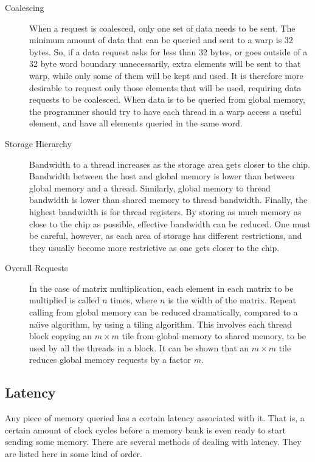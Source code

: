 \documentclass[a4paper,12pt]{report}
\begin{document}
\begin{description}
\item[Coalescing] When a request is coalesced, only one set of data needs to be sent\cite[p~20]{ CUDA_C_Best_Practices_Guide}.
The minimum amount of data that can be queried and sent to a warp is 32 bytes.
So, if a data request asks for less than 32 bytes, or goes outside of a 32 byte word boundary unnecessarily, extra elements will be sent to that warp, while only some of them will be kept and used.
It is therefore more desirable to request only those elements that will be used, requiring data requests to be coalesced.
When data is to be queried from global memory, the programmer should try to have each thread in a warp access a useful element, and have all elements queried in the same word.

\item[Storage Hierarchy] Bandwidth to a thread increases as the storage area gets closer to the chip.
Bandwidth between the host and global memory is lower than between global memory and a thread.
Similarly, global memory to thread bandwidth is lower than shared memory to thread bandwidth.
Finally, the highest bandwidth is for thread registers.
By storing as much memory as close to the chip as possible, effective bandwidth can be reduced.
One must be careful, however, as each area of storage has different restrictions, and they usually become more restrictive as one gets closer to the chip.

\item[Overall Requests] In the case of matrix multiplication, each element in each matrix to be multiplied is called $n$ times, where $n$ is the width of the matrix.
Repeat calling from global memory can be reduced dramatically, compared to a na\"{\i}ve algorithm, by using a tiling algorithm.
This involves each thread block copying an $m\times{m}$ tile from global memory to shared memory, to be used by all the threads in a block.
It can be shown that an $m\times{m}$ tile reduces global memory requests by a factor $m$\cite[p~24]{ KirkAndHwu}\cite[p~18]{ CUDA_C_Programming_Guide}.

\end{description}



\subsection{Latency}\label{subsec:latency}
Any piece of memory queried has a certain latency associated with it.
That is, a certain amount of clock cycles before a memory bank is even ready to start sending some memory.
There are several methods of dealing with latency.
They are listed here in some kind of order.
\end{document}
